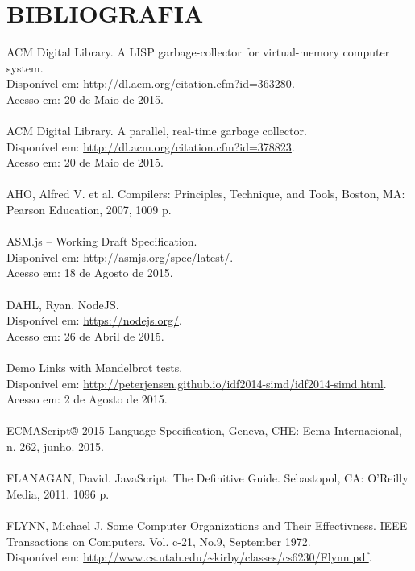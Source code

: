 \documentclass[12pt,a4paper]{article}
\begin{document}
\newpage
\section{BIBLIOGRAFIA}
ACM Digital Library. A LISP garbage-collector for virtual-memory computer system. \\
Disponível em: \url{http://dl.acm.org/citation.cfm?id=363280}. \\
Acesso em: 20 de Maio de 2015. \\
\\
ACM Digital Library. A parallel, real-time garbage collector. \\
Disponível em: \url{http://dl.acm.org/citation.cfm?id=378823}. \\
Acesso em: 20 de Maio de 2015. \\
\\
AHO, Alfred V. et al. Compilers: Principles, Technique, and Tools, Boston, MA: Pearson Education, 2007, 1009 p. \\
\\
ASM.js – Working Draft Specification. \\
Disponivel em: \url{http://asmjs.org/spec/latest/}. \\
Acesso em: 18 de Agosto de 2015. \\
\\
DAHL, Ryan. NodeJS. \\
Disponível em: \url{https://nodejs.org/}. \\
Acesso em: 26 de Abril de 2015. \\
\\
Demo Links with Mandelbrot tests. \\
Disponivel em: \url{http://peterjensen.github.io/idf2014-simd/idf2014-simd.html}. \\
Acesso em: 2 de Agosto de 2015. \\
\\
ECMAScript® 2015 Language Specification, Geneva, CHE: Ecma Internacional, n. 262, junho. 2015. \\
\\
FLANAGAN, David. JavaScript: The Definitive Guide. Sebastopol, CA: O'Reilly Media, 2011. 1096 p. \\
\\
FLYNN, Michael J. Some Computer Organizations and Their Effectivness. IEEE Transactions on Computers. Vol. c-21, No.9, September 1972. \\
Disponível em: \url{http://www.cs.utah.edu/~kirby/classes/cs6230/Flynn.pdf}. \\
\end{document}
